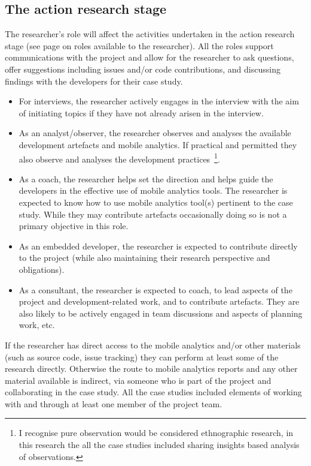 \subsection{The action research stage}
 The researcher's role will affect the activities undertaken in the action research stage (see page \pageref{section-evaluation-through-action-research-method} on roles available to the researcher). All the roles support communications with the project and allow for the researcher to ask questions, offer suggestions including issues and/or code contributions, and discussing findings with the developers for their case study. 
\begin{itemize}
    \itemsep0em
    \item For interviews, the researcher actively engages in the interview with the aim of initiating topics if they have not already arisen in the interview.
    \item As an analyst/observer, the researcher observes and analyses the available development artefacts and mobile analytics. If practical and permitted they also observe and analyses the development practices~\footnote{I recognise pure observation would be considered ethnographic research, in this research the all the case studies included sharing insights based analysis of observations.}. 
    \item As a coach, the researcher helps set the direction and helps guide the developers in the effective use of mobile analytics tools. The researcher is expected to know how to use mobile analytics tool(s) pertinent to the case study. While they may contribute artefacts occasionally doing so is not a primary objective in this role.
    \item As an embedded developer, the researcher is expected to contribute directly to the project (while also maintaining their research perspective and obligations).
    \item As a consultant, the researcher is expected to coach, to lead aspects of the project and development-related work, and to contribute artefacts. They are also likely to be actively engaged in team discussions and aspects of planning work, etc. 
\end{itemize}

If the researcher has direct access to the mobile analytics and/or other materials (such as source code, issue tracking) they can perform at least some of the research directly. Otherwise the route to mobile analytics reports and any other material available is indirect, via someone who is part of the project and collaborating in the case study. All the case studies included elements of working with and through at least one member of the project team.

